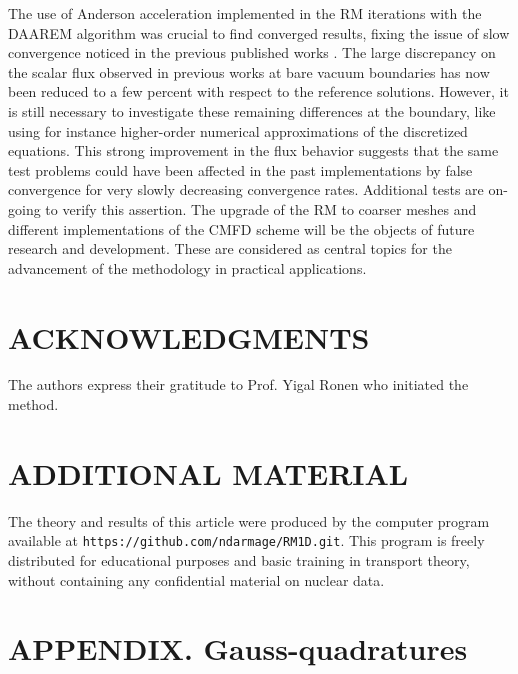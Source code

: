 \documentclass{ictt26}
\begin{document}
The use of Anderson acceleration implemented in the RM iterations with the DAAREM algorithm was crucial to find converged results, fixing the issue of slow convergence noticed in the previous published works \cite{tomatis2011application,gross2020high}. The large discrepancy on the scalar flux observed in previous works at bare vacuum boundaries has now been reduced to a few percent with respect to the reference solutions. However, it is still necessary to investigate these remaining differences at the boundary, like using for instance higher-order numerical approximations of the discretized equations. This strong improvement in the flux behavior suggests that the same test problems could have been affected in the past implementations by false convergence for very slowly decreasing convergence rates. Additional tests are on-going to verify this assertion. The upgrade of the RM to coarser meshes and different implementations of the CMFD scheme will be the objects of future research and development. These are considered as central topics for the advancement of the methodology in practical applications.


\section*{ACKNOWLEDGMENTS}

The authors express their gratitude to Prof. Yigal Ronen who initiated the method.

\section*{ADDITIONAL MATERIAL}

The theory and results of this article were produced by the computer program available at \texttt{https://github.com/ndarmage/RM1D.git}. This program is freely distributed for educational purposes and basic training in transport theory, without containing any confidential material on nuclear data.

\appendix
\section{APPENDIX. Gauss-quadratures}
\label{sec:apx_Flurig}
\end{document}
